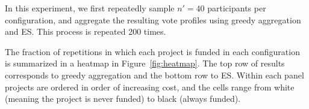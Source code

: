 \documentclass[runningheads]{llncs}
\newcommand{\mes}{ES}
\begin{document}
In this experiment, we first repeatedly sample $n'=40$ participants per configuration, and aggregate the resulting vote profiles using greedy aggregation and \mes{}. This process is repeated 200 times.%

The fraction of repetitions in which each project is funded in each configuration is summarized in a heatmap in Figure~\ref{fig:heatmap}. The top row of results corresponds to greedy aggregation and the bottom row to \mes. Within each panel projects are ordered in order of increasing cost, and the cells range from white (meaning the project is never funded) to black (always funded). 





\end{document}
